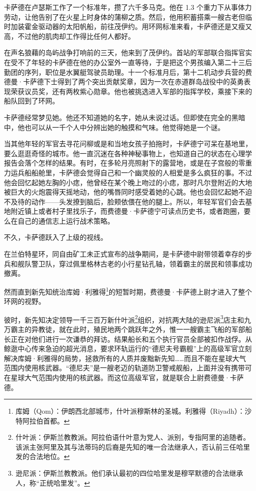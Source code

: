 \documentclass[AutoFakeBold=true]{book}
\begin{document}
卡萨德在卢瑟斯工作了一个标准年，攒了六千多马克。他在 1.3 个重力下从事体力劳动，让他告别了在火星上时身体的蒲柳之质。然后，他用积蓄搭乘一艘古老但临时加装霍金驱动器的太阳帆船，前往茂伊约。用环网标准来看，卡萨德还是又瘦又高，不过他的肌肉却工作得比任何人都好。

在声名狼藉的岛屿战争打响前的三天，他来到了茂伊约。首站的军部联合指挥官实在受不了年轻的卡萨德在他的办公室外一直等待，于是把这个男孩编入第二十三后勤团的序列，职位是水翼艇驾驶员助理。十一个标准月后，第十二机动步兵营的费德曼·卡萨德下士得到了两个突出贡献奖章，因为一次在赤道群岛战役中的英勇表现荣获议员奖，还有两枚紫心勋章。他也被挑选进入军部的指挥学校，乘接下来的船队回到了环网。

\vspace*{1em}

卡萨德经常梦见她。他还不知道她的名字，她从未说过话。但即使在完全的黑暗中，他也可以从一千个人中分辨出她的触摸和气味。他觉得她是一个谜。

当其他年轻的军官去寻花问柳或是和当地女孩子拍拖时，卡萨德宁可呆在基地里，要么逛逛奇怪的城市。他一直沉迷在各种神秘事物上，也知道自己的状态在心理学报告会落个怎样的结果。有时，在多轮月亮照射下的露营地，或是在子宫般的零重力运兵船船舱里，卡萨德会觉得自己和一个幽灵般的人相爱是多么疯狂的事。不过他会回忆起她左胸的小痣，他曾经在某个晚上吻过的小痣，那时凡尔登附近的大地被巨大的火炮震得天摇地动，他的嘴唇同时感受着她的心跳。他也会回忆起她不迫不及待的动作——头发撩到脑后，脸颊依偎在他的腿上。所以，年轻军官们会去基地附近镇上或者村子里找乐子，而费德曼·卡萨德宁可读点历史书，或者跑圈，要么在自己的通信志上运行战术策略。

不久，卡萨德跃入了上级的视线。

在兰伯特星环，同自由矿工未正式宣布的战争期间，是卡萨德中尉带领着幸存的步兵和舰队警卫队，穿过佩里格林古老的小行星钻孔轴，领着霸主的居民和领事成功撤离。

然而直到新先知统治库姆·利雅得\footnote{库姆（Qom）：伊朗西北部城市，什叶派穆斯林的圣城。利雅得（Riyadh）：沙特阿拉伯首都。}的短暂时期，费德曼·卡萨德上尉才进入了整个环网的视野。

彼时，新先知决定领导一千三百万新什叶派\footnote{什叶派：伊斯兰教教派。阿拉伯语什叶意为党人、派别，专指阿里的追随者。该派主张阿里及其与法蒂玛的后裔是先知的唯一合法继承人，否认前三任哈里发的合法地位。}组织，对抗两大陆的逊尼派\footnote{逊尼派：伊斯兰教教派。他们承认最初的四位哈里发是穆罕默德的合法继承人，称``正统哈里发''。}店主和九万霸主的异教徒，就在此时，殖民地两个跳跃年之外，惟一一艘霸主飞船的军部船长正在对他们进行一次谦恭的拜访。结果船长和五个执行官员全部被扣作战俘。从鲸逖中心传来急迫的超光消息，要求环轨运行的``德尼夫号霸舰''上的高级军官立刻解决库姆·利雅得的局势，拯救所有的人质并废黜新先知……而且不能在星球大气范围内使用核武器。``德尼夫''是一艘老迈的轨道防卫警戒舰船，上面并没有携带可在星球大气范围内使用的核武器。而这位高级军官，就是联合上尉费德曼·卡萨德。
\end{document}
